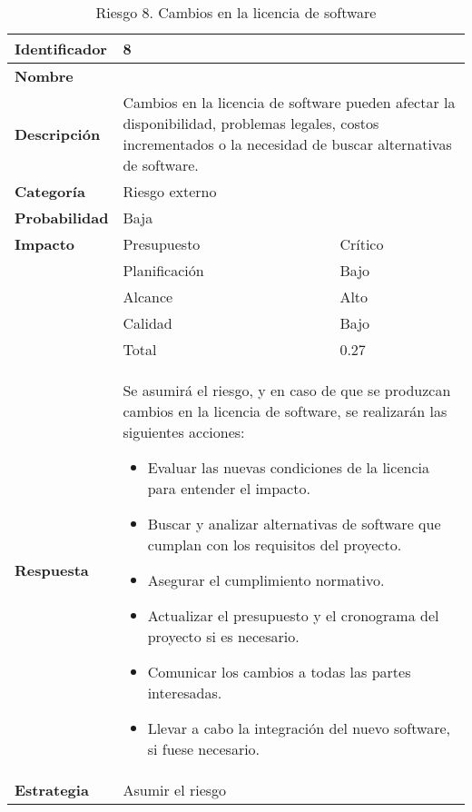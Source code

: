 \begin{table}[H]
    \centering
    \caption{Riesgo 8. Cambios en la licencia de software}
    \label{table:risk_licencia}
    \begin{tabular}{>{\columncolor{lightgreen!20}}l l l}
    \toprule
    \rowcolor{lightgreen}
    \textbf{Identificador} & \multicolumn{2}{l}{8} \\
    \midrule
    \textbf{Nombre} & \multicolumn{2}{l}{} \\
    \midrule
    \textbf{Descripción} & \multicolumn{2}{p{10cm}}{Cambios en la licencia de software pueden afectar la disponibilidad, problemas legales, costos incrementados o la necesidad de buscar alternativas de software.} \\
    \midrule
    \textbf{Categoría} & \multicolumn{2}{l}{Riesgo externo} \\
    \midrule
    \textbf{Probabilidad} & \multicolumn{2}{l}{Baja} \\
    \midrule
    \textbf{Impacto} & Presupuesto & Crítico \\
    \cmidrule(lr){2-3}
    & Planificación & Bajo \\
    \cmidrule(lr){2-3}
    & Alcance & Alto \\
    \cmidrule(lr){2-3}
    & Calidad & Bajo \\
    \cmidrule(lr){2-3}
    & Total & 0.27 \\
    \midrule
    \textbf{Respuesta} & \multicolumn{2}{p{10cm}}{Se asumirá el riesgo, y en caso de que se produzcan cambios en la licencia de software, se realizarán las siguientes acciones:
    \begin{itemize}
    \item Evaluar las nuevas condiciones de la licencia para entender el impacto.
    \item Buscar y analizar alternativas de software que cumplan con los requisitos del proyecto.
    \item Asegurar el cumplimiento normativo.
    \item Actualizar el presupuesto y el cronograma del proyecto si es necesario.
    \item Comunicar los cambios a todas las partes interesadas.
    \item Llevar a cabo la integración  del nuevo software, si fuese necesario.
    \end{itemize} } \\
    \midrule
    \textbf{Estrategia} & \multicolumn{2}{l}{Asumir el riesgo} \\
    \bottomrule
    \end{tabular}
\end{table}


